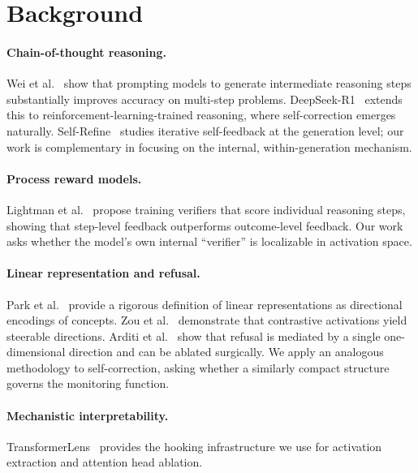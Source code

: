 \documentclass{article}
\begin{document}
\section{Background}
\label{sec:background}

\paragraph{Chain-of-thought reasoning.}
Wei et al.~\citep{wei2022chain} show that prompting models to generate intermediate reasoning steps substantially improves accuracy on multi-step problems.
DeepSeek-R1~\citep{deepseek2025r1} extends this to reinforcement-learning-trained reasoning, where self-correction emerges naturally.
Self-Refine~\citep{madaan2023selfrefine} studies iterative self-feedback at the generation level; our work is complementary in focusing on the internal, within-generation mechanism.

\paragraph{Process reward models.}
Lightman et al.~\citep{lightman2023let} propose training verifiers that score individual reasoning steps, showing that step-level feedback outperforms outcome-level feedback.
Our work asks whether the model's own internal ``verifier'' is localizable in activation space.

\paragraph{Linear representation and refusal.}
Park et al.~\citep{park2024linear} provide a rigorous definition of linear representations as directional encodings of concepts.
Zou et al.~\citep{zou2023representation} demonstrate that contrastive activations yield steerable directions.
Arditi et al.~\citep{arditi2024refusal} show that refusal is mediated by a single one-dimensional direction and can be ablated surgically.
We apply an analogous methodology to self-correction, asking whether a similarly compact structure governs the monitoring function.

\paragraph{Mechanistic interpretability.}
TransformerLens~\citep{nanda2022transformerlens} provides the hooking infrastructure we use for activation extraction and attention head ablation.
\end{document}
